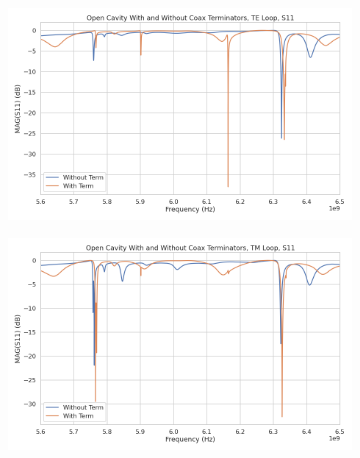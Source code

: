 \begin{figure}[htbp]
    \centering
    \begin{subfigure}{0.67\textwidth}
        \includegraphics*[width=\textwidth]{figs/Chapter-6/210922_open_cavity_with_and_without_term_TE.png}
        \caption{}
    \end{subfigure}
    \hfill
    \begin{subfigure}{0.67\textwidth}
        \includegraphics*[width=\textwidth]{figs/Chapter-6/210922_open_cavity_with_and_without_term_TM.png}
        \caption{}
    \end{subfigure}
    \caption{}
\end{figure}

